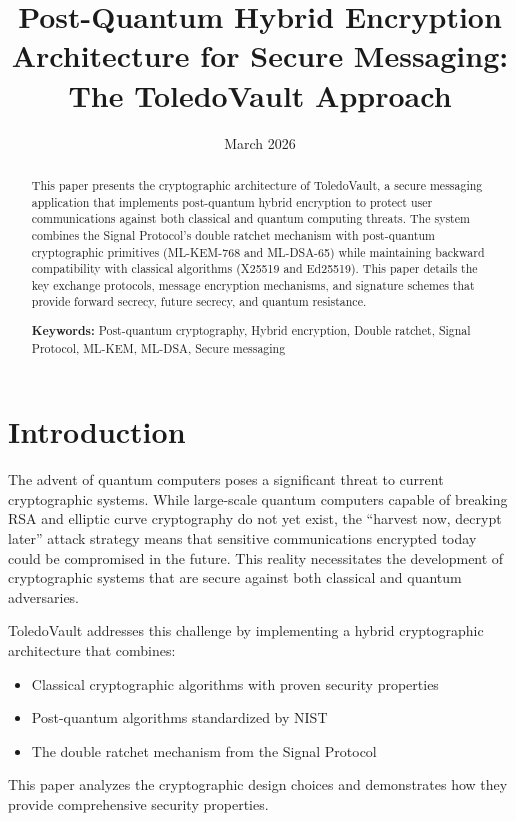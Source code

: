 \documentclass[12pt,a4paper]{article}
\title{Post-Quantum Hybrid Encryption Architecture for Secure Messaging: The ToledoVault Approach}
\author{}
\date{March 2026}
\begin{document}
\maketitle

\begin{abstract}
This paper presents the cryptographic architecture of ToledoVault, a secure messaging application that implements post-quantum hybrid encryption to protect user communications against both classical and quantum computing threats. The system combines the Signal Protocol's double ratchet mechanism with post-quantum cryptographic primitives (ML-KEM-768 and ML-DSA-65) while maintaining backward compatibility with classical algorithms (X25519 and Ed25519). This paper details the key exchange protocols, message encryption mechanisms, and signature schemes that provide forward secrecy, future secrecy, and quantum resistance.

\textbf{Keywords:} Post-quantum cryptography, Hybrid encryption, Double ratchet, Signal Protocol, ML-KEM, ML-DSA, Secure messaging
\end{abstract}

\section{Introduction}

The advent of quantum computers poses a significant threat to current cryptographic systems. While large-scale quantum computers capable of breaking RSA and elliptic curve cryptography do not yet exist, the ``harvest now, decrypt later'' attack strategy means that sensitive communications encrypted today could be compromised in the future. This reality necessitates the development of cryptographic systems that are secure against both classical and quantum adversaries.

ToledoVault addresses this challenge by implementing a hybrid cryptographic architecture that combines:
\begin{itemize}
    \item Classical cryptographic algorithms with proven security properties
    \item Post-quantum algorithms standardized by NIST
    \item The double ratchet mechanism from the Signal Protocol
\end{itemize}

This paper analyzes the cryptographic design choices and demonstrates how they provide comprehensive security properties.
\end{document}

